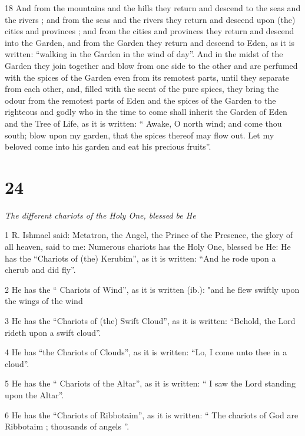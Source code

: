 \par 18 And from the mountains and the hills they return and descend to the seas and the rivers ; and from the seas and the rivers they return and descend upon (the) cities and provinces ; and from the cities and provinces they return and descend into the Garden, and from the Garden they return and descend to Eden, as it is written: “walking in the Garden in the wind of day”. And in the midst of the Garden they join together and blow from one side to the other and are perfumed with the spices of the Garden even from its remotest parts, until they separate from each other, and, filled with the scent of the pure spices, they bring the odour from the remotest parts of Eden and the spices of the Garden to the righteous and godly who in the time to come shall inherit the Garden of Eden and the Tree of Life, as it is written: “ Awake, O north wind; and come thou south; blow upon my garden, that the spices thereof may flow out. Let my beloved come into his garden and eat his precious fruits”. 

\chapter{24}

\par \textit{The different chariots of the Holy One, blessed be He}

\par 1 R. Ishmael said: Metatron, the Angel, the Prince of the Presence, the glory of all heaven, said to me: Numerous chariots has the Holy One, blessed be He: He has the “Chariots of (the) Kerubim”, as it is written: “And he rode upon a cherub and did fly”. 

\par 2 He has the “ Chariots of Wind”, as it is written (ib.): "and he flew swiftly upon the wings of the wind 

\par 3 He has the “Chariots of (the) Swift Cloud”, as it is written: “Behold, the Lord rideth upon a swift cloud”. 

\par 4 He has “the Chariots of Clouds”, as it is written: “Lo, I come unto thee in a cloud”. 

\par 5 He has the “ Chariots of the Altar”, as it is written: “ I saw the Lord standing upon the Altar”. 

\par 6 He has the “Chariots of Ribbotaim”, as it is written: “ The chariots of God are Ribbotaim ; thousands of angels ”. 

